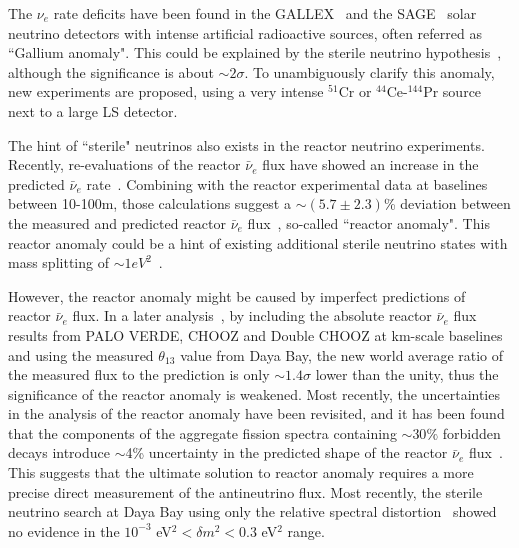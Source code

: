 

The $\nu_e$ rate deficits have been found in the GALLEX~\cite{GALLEX,GALLEX2010} and the SAGE~\cite{SAGE,SAGE2009} solar neutrino detectors with intense artificial radioactive sources, often referred as ``Gallium anomaly". This could be explained by the sterile neutrino hypothesis~\cite{Guinti2010}, although the significance is about $\sim2\sigma$. To unambiguously clarify this anomaly, new experiments are proposed, using a very intense $^{51}$Cr or $^{44}$Ce-$^{144}$Pr source~\cite{Cribier2011,Dwyer2013,SOX,CeLAND} next to a large LS detector.


The hint of ``sterile" neutrinos also exists in the reactor neutrino experiments. Recently, re-evaluations of the reactor $\bar\nu_e$ flux have showed an increase in the predicted $\bar\nu_e$ rate~\cite{Mueller2011, Huber2011}. Combining with the reactor experimental data at baselines between 10-100m, those calculations suggest a $\sim(5.7\pm2.3)$\% deviation between the measured and predicted reactor $\bar\nu_e$ flux~\cite{Mention2011}, so-called ``reactor anomaly". This reactor anomaly could be a hint of existing additional sterile neutrino states with mass splitting of $\sim1 eV^2$~\cite{Guinti2011}.

However, the reactor anomaly might be caused by imperfect predictions of reactor $\bar\nu_e$ flux. In a later analysis~\cite{Zhang13}, by including the absolute reactor $\bar\nu_e$ flux results from PALO VERDE, CHOOZ and Double CHOOZ at km-scale baselines and using the measured $\theta_{13}$ value from Daya Bay, the new world average ratio of the measured flux to the prediction is only $\sim1.4\sigma$ lower than the unity, thus the significance of the reactor anomaly is weakened. Most recently, the uncertainties in the analysis of the reactor anomaly have been revisited, and it has been found that the components of the aggregate fission spectra containing $\sim30\%$ forbidden decays introduce $\sim$4\% uncertainty in the predicted shape of the reactor $\bar\nu_e$ flux~\cite{Hayes}. This suggests that the ultimate solution to reactor anomaly requires a more precise direct measurement of the antineutrino flux. Most recently, the sterile neutrino search at Daya Bay using only the relative spectral distortion~\cite{DayaBaySterile} showed no evidence in the $10^{-3}$ eV$^2<\delta m^2<0.3$ eV$^2$ range.

